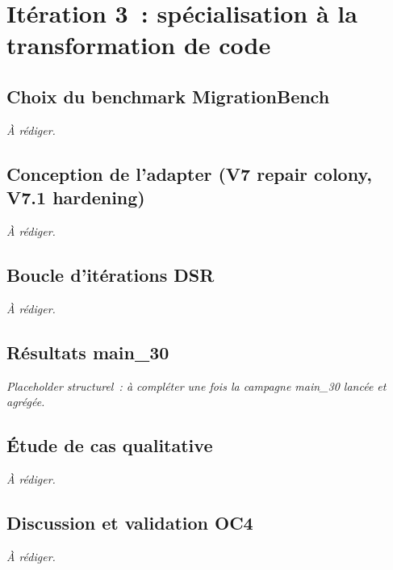 \chapter{It\'eration 3~: sp\'ecialisation \`a la transformation de code}\label{chap:migrationbench}


\section{Choix du benchmark MigrationBench}\label{sec:mb-choix}

\textit{\`A r\'ediger.}

\section{Conception de l'adapter (V7 repair colony, V7.1 hardening)}\label{sec:mb-adapter}

\textit{\`A r\'ediger.}

\section{Boucle d'it\'erations DSR}\label{sec:mb-iterations}

\textit{\`A r\'ediger.}

\section{R\'esultats main\_30}\label{sec:mb-main30}

\textit{Placeholder structurel~: \`a compl\'eter une fois la campagne main\_30 lanc\'ee
et agr\'eg\'ee.}

\section{\'Etude de cas qualitative}\label{sec:mb-case-study}

\textit{\`A r\'ediger.}

\section{Discussion et validation OC4}\label{sec:mb-discussion}

\textit{\`A r\'ediger.}
